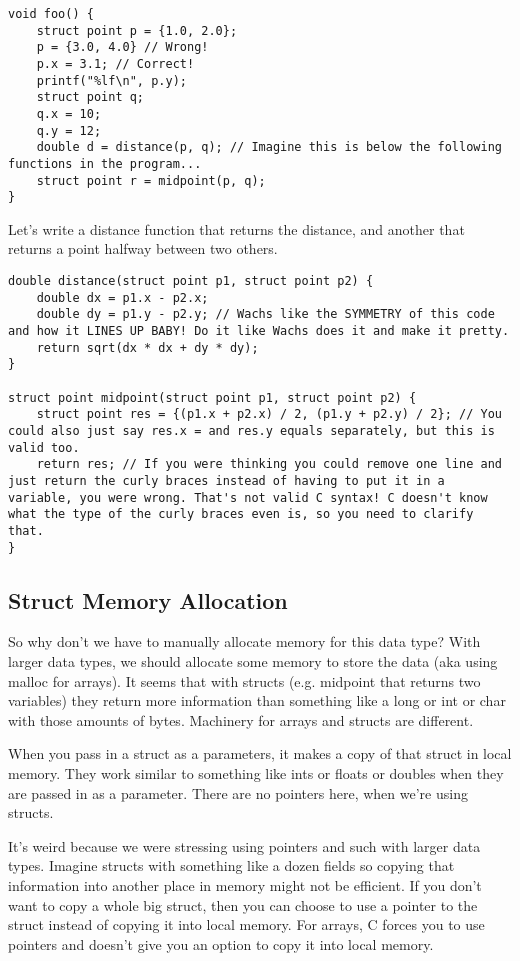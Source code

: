 \documentclass[12pt]{article}
\theoremstyle{definition}
\begin{document}
\begin{lstlisting}
void foo() {
    struct point p = {1.0, 2.0};
    p = {3.0, 4.0} // Wrong!
    p.x = 3.1; // Correct!
    printf("%lf\n", p.y);
    struct point q;
    q.x = 10;
    q.y = 12;
    double d = distance(p, q); // Imagine this is below the following functions in the program...
    struct point r = midpoint(p, q);
}
\end{lstlisting}
Let's write a distance function that returns the distance, and another that returns a point halfway between two others. 
\begin{lstlisting}
double distance(struct point p1, struct point p2) {
    double dx = p1.x - p2.x;
    double dy = p1.y - p2.y; // Wachs like the SYMMETRY of this code and how it LINES UP BABY! Do it like Wachs does it and make it pretty.
    return sqrt(dx * dx + dy * dy);
}

struct point midpoint(struct point p1, struct point p2) {
    struct point res = {(p1.x + p2.x) / 2, (p1.y + p2.y) / 2}; // You could also just say res.x = and res.y equals separately, but this is valid too. 
    return res; // If you were thinking you could remove one line and just return the curly braces instead of having to put it in a variable, you were wrong. That's not valid C syntax! C doesn't know what the type of the curly braces even is, so you need to clarify that. 
}
\end{lstlisting}
\subsection{Struct Memory Allocation}
So why don't we have to manually allocate memory for this data type? With larger data types, we should allocate some memory to store the data (aka using malloc for arrays). It seems that with structs (e.g. midpoint that returns two variables) they return more information than something like a long or int or char with those amounts of bytes. Machinery for arrays and structs are different. 

\note When you pass in a struct as a parameters, it makes a copy of that struct in local memory. They work similar to something like ints or floats or doubles when they are passed in as a parameter. There are no pointers here, when we're using structs. 

It's weird because we were stressing using pointers and such with larger data types. Imagine structs with something like a dozen fields so copying that information into another place in memory might not be efficient. If you don't want to copy a whole big struct, then you can choose to use a pointer to the struct instead of copying it into local memory. For arrays, C forces you to use pointers and doesn't give you an option to copy it into local memory. 
\end{document}
